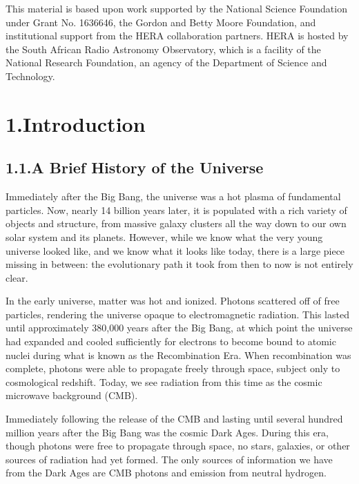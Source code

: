 \documentclass[12pt]{article}
\begin{document}
This material is based upon work supported by the National Science Foundation under Grant No. 1636646, the Gordon and Betty Moore Foundation, and institutional support from the HERA collaboration partners. HERA is hosted by the South African Radio Astronomy Observatory, which is a facility of the National Research Foundation, an agency of the Department of Science and Technology.

\clearpage
{}

\tocless\section{\hypertarget{sec:introduction}{1.\hspace{0.75em}Introduction}}

\tocless\subsection{\hypertarget{subsec:universe}{1.1.\hspace{0.75em}A Brief History of the Universe}}

Immediately after the Big Bang, the universe was a hot plasma of fundamental particles. Now, nearly 14 billion years later, it is populated with a rich variety of objects and structure, from massive galaxy clusters all the way down to our own solar system and its planets. However, while we know what the very young universe looked like, and we know what it looks like today, there is a large piece missing in between: the evolutionary path it took from then to now is not entirely clear.

In the early universe, matter was hot and ionized. Photons scattered off of free particles, rendering the universe opaque to electromagnetic radiation. This lasted until approximately 380,000 years after the Big Bang, at which point the universe had expanded and cooled sufficiently for electrons to become bound to atomic nuclei during what is known as the Recombination Era. When recombination was complete, photons were able to propagate freely through space, subject only to cosmological redshift. Today, we see radiation from this time as the cosmic microwave background (CMB).

Immediately following the release of the CMB and lasting until several hundred million years after the Big Bang was the cosmic Dark Ages. During this era, though photons were free to propagate through space, no stars, galaxies, or other sources of radiation had yet formed. The only sources of information we have from the Dark Ages are CMB photons and emission from neutral hydrogen.
\end{document}
